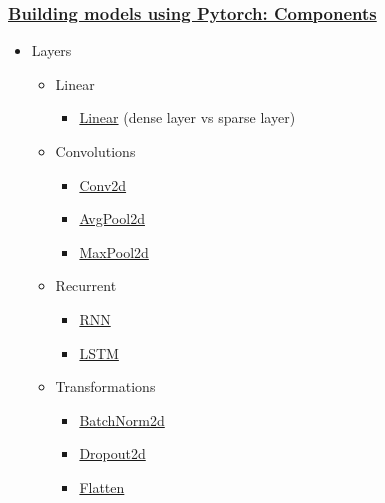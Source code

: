\begin{frame}[fragile]
   \frametitle{\href{https://pytorch.org/docs/stable/nn.html}{Building models using Pytorch: Components}}
   \begin{itemize}
      \item Layers
      \begin{itemize}
         \item Linear
         \begin{itemize}
            \item \href{https://pytorch.org/docs/stable/generated/torch.nn.Linear.html}{Linear} (dense layer vs sparse layer)
         \end{itemize}

         \item Convolutions
         \begin{itemize}
               \item \href{https://pytorch.org/docs/stable/generated/torch.nn.Conv2d.html#torch.nn.Conv2d}{Conv2d}
               \item \href{https://pytorch.org/docs/stable/generated/torch.nn.AvgPool2d.html#torch.nn.AvgPool2d}{AvgPool2d}
               \item \href{https://pytorch.org/docs/stable/generated/torch.nn.MaxPool2d.html#torch.nn.MaxPool2d}{MaxPool2d}
         \end{itemize}

         \item Recurrent
         \begin{itemize}
            \item \href{https://pytorch.org/docs/stable/generated/torch.nn.RNN.html#torch.nn.RNN}{RNN}
            \item \href{https://pytorch.org/docs/stable/generated/torch.nn.LSTM.html#torch.nn.LSTM}{LSTM}
         \end{itemize}

         \item Transformations
         \begin{itemize}
            \item \href{https://pytorch.org/docs/stable/generated/torch.nn.BatchNorm2d.html#torch.nn.BatchNorm2d}{BatchNorm2d}
            \item \href{https://pytorch.org/docs/stable/generated/torch.nn.Dropout2d.html#torch.nn.Dropout2d}{Dropout2d}
            \item \href{https://pytorch.org/docs/stable/generated/torch.flatten.html}{Flatten}
         \end{itemize}
      \end{itemize}


\end{itemize}
\end{frame}
